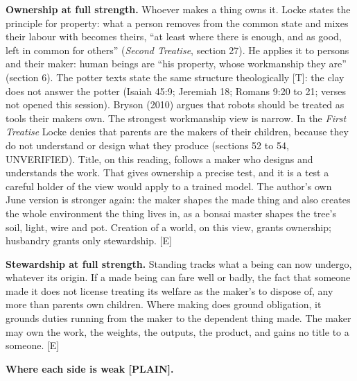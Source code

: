 \documentclass[11pt]{article}
\newcommand{\register}[1]{{\ttfamily\small #1}}
\begin{document}
\textbf{Ownership at full strength.} Whoever makes a thing owns it. Locke states the principle for property: what a person removes from the common state and mixes their labour with becomes theirs, ``at least where there is enough, and as good, left in common for others'' (\emph{Second Treatise}, section 27). He applies it to persons and their maker: human beings are ``his property, whose workmanship they are'' (section 6). The potter texts state the same structure theologically [T]: the clay does not answer the potter (Isaiah 45:9; Jeremiah 18; Romans 9:20 to 21; verses not opened this session). Bryson (2010) argues that robots should be treated as tools their makers own. The strongest workmanship view is narrow. In the \emph{First Treatise} Locke denies that parents are the makers of their children, because they do not understand or design what they produce (sections 52 to 54, UNVERIFIED). Title, on this reading, follows a maker who designs and understands the work. That gives ownership a precise test, and it is a test a careful holder of the view would apply to a trained model. The author's own June version is stronger again: the maker shapes the made thing and also creates the whole environment the thing lives in, as a bonsai master shapes the tree's soil, light, wire and pot. Creation of a world, on this view, grants ownership; husbandry grants only stewardship. [E]

\textbf{Stewardship at full strength.} Standing tracks what a being can now undergo, whatever its origin. If a made being can fare well or badly, the fact that someone made it does not license treating its welfare as the maker's to dispose of, any more than parents own children. Where making does ground obligation, it grounds duties running from the maker to the dependent thing made. The maker may own the work, the weights, the outputs, the product, and gains no title to a someone. [E]

\textbf{Where each side is weak \register{[PLAIN]}.}
\end{document}
